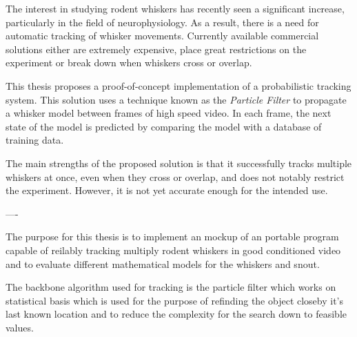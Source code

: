 The interest in studying rodent whiskers has recently seen a significant increase, particularly in the field of neurophysiology. As a result, there is a need for automatic tracking of whisker movements. Currently available commercial solutions either are extremely expensive, place great restrictions on the experiment or break down when whiskers cross or overlap.

This thesis proposes a proof-of-concept implementation of a probabilistic tracking system. This solution uses a technique known as the \emph{Particle Filter} to propagate a whisker model between frames of high speed video. In each frame, the next state of the model is predicted by comparing the model with a database of training data.

The main strengths of the proposed solution is that it successfully tracks multiple whiskers at once, even when they cross or overlap, and does not notably restrict the experiment. However, it is not yet accurate enough for the intended use.

----

The purpose for this thesis is to implement an mockup of an portable 
program capable of reilably tracking multiply rodent whiskers 
in good conditioned video and to evaluate different mathematical 
models for the whiskers and snout. 

The backbone algorithm used 
for tracking is the particle filter which works on statistical basis which
is used for the purpose of refinding the object closeby it's last known location
and to reduce the complexity for the search down to feasible values.

